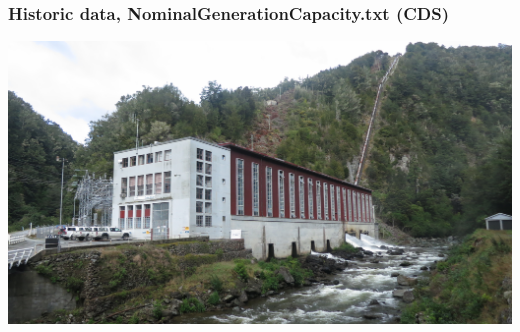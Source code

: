 \documentclass[aspectratio=169]{beamer}
\begin{document}
\frame
{\frametitle{Historic data, NominalGenerationCapacity.txt (CDS)}
\begin{center}
\includegraphics[height=7.5cm]{cobb.jpg} 
\end{center}
}
\end{document}
